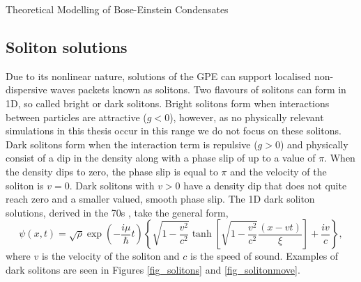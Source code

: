 \begin{chapter}{\label{cha:theoretical_model}Theoretical Modelling of Bose-Einstein Condensates}
	\subsection{\label{section:soliton} Soliton solutions}
	Due to its nonlinear nature, solutions of the GPE can support localised non-dispersive waves packets known as solitons. Two flavours of solitons can form in 1D, so called bright or dark solitons. Bright solitons form when interactions between particles are attractive ($g<0$), however, as no physically relevant simulations in this thesis occur in this range we do not focus on these solitons. Dark solitons form when the interaction term is repulsive ($g>0$) and physically consist of a dip in the density along with a phase slip of up to a value of $\pi$. When the density dips to zero, the phase slip is equal to $\pi$ and the velocity of the soliton is $v=0$. Dark solitons with $v>0$ have a density dip that does not quite reach zero and a smaller valued, smooth phase slip. The 1D dark soliton solutions, derived in the 70s \cite{zakharov72,zakharov73}, take the general form,
	\begin{equation}
		\psi(x,t) = \sqrt{\rho}\exp\left(-\frac{i\mu}{\hbar}t\right)\left\{ \sqrt{1-\frac{v^2}{c^2}} \tanh\left[ \sqrt{1-\frac{v^2}{c^2}}\frac{(x-vt)}{\xi} \right ] + \frac{iv}{c}  \right \} ,
	\end{equation}
	where $v$ is the velocity of the soliton and $c$ is the speed of sound. Examples of dark solitons are seen in Figures \ref{fig_solitons} and \ref{fig_solitonmove}.
	\begin{figure}[!ht]
	\centering
\end{figure}
\end{chapter}
